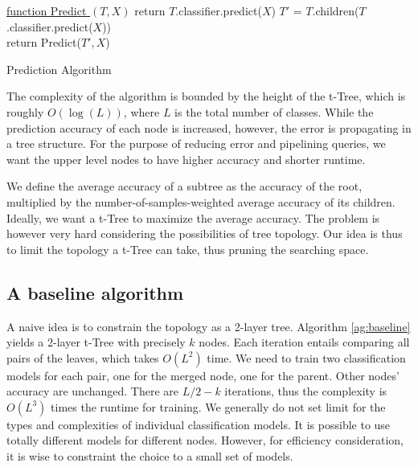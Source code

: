 \documentclass{article}
\begin{document}
\begin{algorithm}[H]\label{ag:prediction}

    \underline{function Predict $(T, X)$}\;
      {
        return $T$.classifier.predict($X$)
      }
      {
        $T'$ = $T$.children($T$.classifier.predict($X$))\\
        return Predict($T',X$)
      }
    
    \caption{Prediction Algorithm}
\end{algorithm}

The complexity of the algorithm is bounded by the height of the t-Tree, which is roughly $O(\log(L))$, where $L$ is the total number of classes. While the prediction accuracy of each node is increased, however, the error is propagating in a tree structure. For the purpose of reducing error and pipelining queries, we want the upper level nodes to have higher accuracy and shorter runtime.

We define the average accuracy of a subtree as the accuracy of the root, multiplied by the number-of-samples-weighted average accuracy of its children. Ideally, we want a t-Tree to maximize the average accuracy. The problem is however very hard considering the possibilities of tree topology. Our idea is thus to limit the topology a t-Tree can take, thus pruning the searching space.

\subsection{A baseline algorithm}
A naive idea is to constrain the topology as a 2-layer tree. Algorithm \ref{ag:baseline} yields a 2-layer t-Tree with precisely $k$ nodes. Each iteration entails comparing all pairs of the leaves, which takes $O(L^2)$ time. We need to train two classification models for each pair, one for the merged node, one for the parent. Other nodes' accuracy are unchanged. There are $L/2-k$ iterations, thus the complexity is $O(L^3)$ times the runtime for training. We generally do not set limit for the types and complexities of individual classification models. It is possible to use totally different models for different nodes. However, for efficiency consideration, it is wise to constraint the choice to a small set of models.
\end{document}
